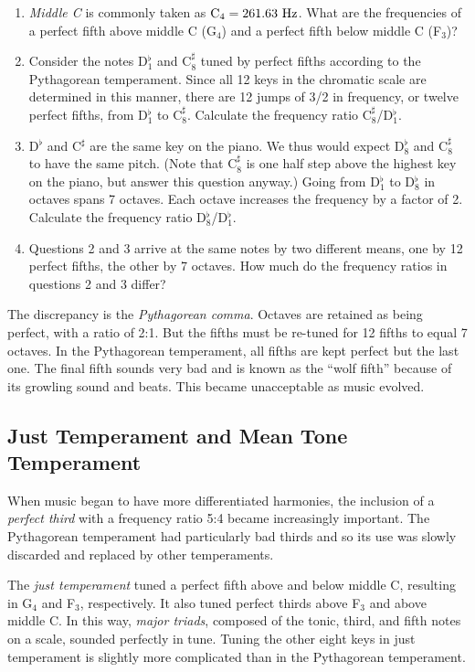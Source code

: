 \documentclass[11pt]{NSF}
\def\ben{\begin{enumerate}}
\def\een{\end{enumerate}}
\begin{document}
\ben
\item
{\em Middle C} is commonly taken as ${\rm C}_4 = 261.63~{\rm Hz}$. 
What are the frequencies of a perfect fifth above middle C (G$_4$) 
and a perfect fifth below middle C (F$_3$)?

\item
Consider the notes D$^\flat_1$ and C$^\sharp_8$ tuned by perfect 
fifths according to the Pythagorean temperament. 
Since all 12 keys in the chromatic scale are
determined in this manner, there are 12 jumps of 3/2 in frequency, or
twelve perfect fifths, from D$^\flat_1$ to C$^\sharp_8$. 
Calculate the frequency ratio C$^\sharp_8$/D$^\flat_1$.

\item 
D$^\flat$ and C$^\sharp$ are the same key on the piano. 
We thus would expect D$^\flat_8$ and
C$^\sharp_8$ to have the same pitch. 
(Note that C$^\sharp_8$ is one half step above the
highest key on the piano, but answer this question anyway.) 
Going from D$^\flat_1$ to D$^\flat_8$ in octaves spans 7 octaves. 
Each octave increases the frequency by a factor of 2. 
Calculate the frequency ratio D$^\flat_8$/D$^\flat_1$.

\item
Questions 2 and 3 arrive at the same notes by two different means, one
by 12 perfect fifths, the other by 7 octaves. 
How much do the frequency ratios in questions 2 and 3 differ?  
\een

The discrepancy is the {\em Pythagorean comma}. 
Octaves are retained as being perfect, with a ratio of 2:1. 
But the fifths must be re-tuned for 12 fifths to equal 7 octaves. 
In the Pythagorean temperament, all fifths are kept perfect but the last one. 
The final fifth sounds very bad and is known as the “wolf fifth” 
because of its growling sound and beats. 
This became unacceptable as music evolved.

\subsection{Just Temperament and Mean Tone Temperament}

When music began to have more differentiated harmonies, the inclusion
of a {\em perfect third} with a frequency ratio 5:4 became increasingly
important. The Pythagorean temperament had particularly bad thirds and
so its use was slowly discarded and replaced by other temperaments.

The {\em just temperament} tuned a perfect fifth above and below middle C,
resulting in G$_4$ and F$_3$, respectively. 
It also tuned perfect thirds above F$_3$ and above middle C. 
In this way, {\em major triads}, composed of the tonic, third, and 
fifth notes on a scale, sounded perfectly in tune. 
Tuning the other eight keys in just temperament is slightly more
complicated than in the Pythagorean temperament.
\end{document}
